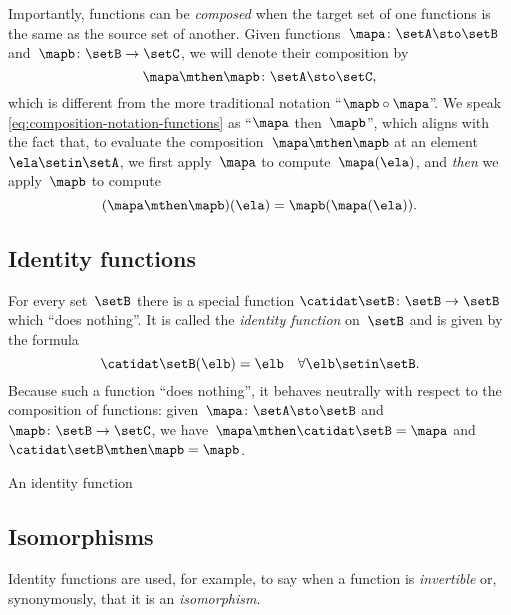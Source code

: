 Importantly, functions can be \emph{composed} when the target set of one functions is the same as the source set of another.
Given functions~$\mapa\colon \setA \sto \setB$ and~$\mapb \colon \setB \to \setC$, we will denote their composition by
\begin{equation}
    \label{eq:composition-notation-functions}
    \mapa \mthen \mapb \colon \setA \sto \setC,
\end{equation}
which is different from the more traditional notation ``$\mapb \circ \mapa$''.
We speak \cref{eq:composition-notation-functions} as ``$\mapa$ then~$\mapb$'', which aligns with the fact that, to evaluate the composition~$\mapa \mthen \mapb$ at an element~$\ela \setin\setA$, we first apply~$\mapa$ to compute~$\mapa(\ela)$, and \emph{then} we apply~$\mapb$ to compute
\begin{equation}
    (\mapa \mthen \mapb)(\ela)
    = \mapb(\mapa(\ela)).
\end{equation}

\subsection{Identity functions}

For every set~$\setB$ there is a special function $\catidat\setB \colon \setB \to \setB$ which ``does nothing''.
It is called the \emph{identity function} on~$\setB$ and is given by the formula
\begin{equation}
    \catidat\setB(\elb) = \elb \quad \forall  \elb \setin\setB.
\end{equation}
Because such a function ``does nothing'', it behaves neutrally with respect to the composition of functions: given~$\mapa \colon \setA \sto \setB$ and~$\mapb \colon \setB \to \setC$, we have~$\mapa \mthen \catidat\setB = \mapa$ and~$\catidat\setB \mthen \mapb = \mapb$.

\begin{marginfigure}
    \centering
    \caption{An identity function}
    \label{fig:identity-function}
\end{marginfigure}

\subsection{Isomorphisms}

Identity functions are used, for example, to say when a function is \emph{invertible} or, synonymously, that it is an \emph{isomorphism}.

